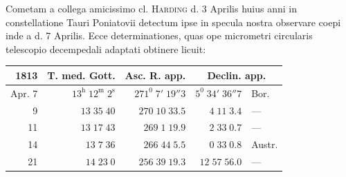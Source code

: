 \renewcommand{\Article}[1]{\par\medskip\Needspace{4\baselineskip}\pdfbookmark[1]{Art. #1}{cometae-art-#1}\centerline{\textbf{#1.}}\nobreak\smallskip}
\par\clearpage
\begingroup
\pagestyle{empty}
\newcommand{\GaussVIGathering}[2]{%
  \fancypagestyle{gaussVIGathering}{%
    \fancyhf{}%
    \renewcommand{\headrulewidth}{0pt}%
    \renewcommand{\footrulewidth}{0pt}%
    \fancyfoot[C]{\makebox[\textwidth][l]{%
      \hspace*{.025\textwidth}{\footnotesize\bfseries #1}\hfill
      {\normalsize\bfseries\textls[90]{#2}}\hspace*{.18\textwidth}}}%
  }%
  \thispagestyle{gaussVIGathering}%
}
\thispagestyle{empty}
\noindent{}%
\par
\vspace*{.15\textheight}
\noindent{}\par\nobreak\medskip
\indent Cometam a collega amicissimo cl. \textsc{Harding} d. 3 Aprilis huius anni in constellatione Tauri Poniatovii detectum ipse in specula nostra observare coepi inde a d. 7 Aprilis. Ecce determinationes, quas ope micrometri circularis telescopio decempedali adaptati obtinere licuit:
\begin{center}\small\setlength{\tabcolsep}{4pt}
\begin{tabular}{r|r|r|r l}
1813&T. med. Gott.&Asc. R. app.&\multicolumn{2}{c}{Declin. app.}\\\hline
Apr. 7&$13^{\mathrm h}\;12^{\mathrm m}\;2^{\mathrm s}$&$271^0\;7'\;19''3$&$5^0\;34'\;36''7$&Bor.\\
9&$13\;35\;40$&$270\;10\;33.5$&$4\;11\;3.4$&—\\
11&$13\;17\;43$&$269\;1\;19.9$&$2\;33\;0.7$&—\\
14&$13\;7\;36$&$266\;44\;5.5$&$0\;33\;0.8$&Austr.\\
21&$14\;23\;0$&$256\;39\;19.3$&$12\;57\;56.0$&—
\end{tabular}\end{center}

